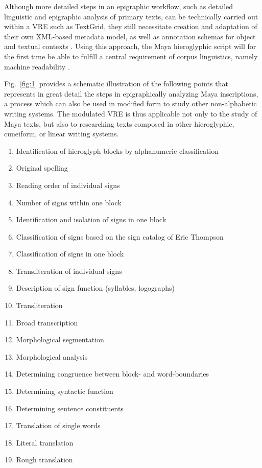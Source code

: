 \documentclass[amsthm,ebook]{saparticle}
\begin{document}
Although more detailed steps in an epigraphic workflow, such as detailed linguistic and epigraphic analysis of primary
texts, can be technically carried out within a VRE such as TextGrid, they still necessitate creation and adaptation of
their own XML-based metadata model, as well as annotation schemas for object and textual contexts \citep{Prager2015}. Using
this approach, the Maya hieroglyphic script will for the first time be able to fulfill a central requirement of corpus
linguistics, namely machine readability \citep{McEneryWilson2001}. 

Fig.~\ref{fig:1} provides a schematic illustration of the following points that represents in great detail the steps in
epigraphically analyzing Maya inscriptions, a process which can also be used in modified form to study other
non-alphabetic writing systems. The modulated VRE is thus applicable not only to the study of Maya texts, but also to
researching texts composed in other hieroglyphic, cuneiform, or linear writing systems. 




\begin{enumerate}
\item Identification of hieroglyph blocks by alphanumeric classification 
\item Original spelling
\item Reading order of individual signs 
\item Number of signs within one block 
\item Identification and isolation of signs in one block 
\item Classification of signs based on the sign catalog of Eric Thompson \citep{Thompson1962}
\item Classification of signs in one block \citep{Thompson1962} 
\item Transliteration of individual signs 
\item Description of sign function (syllables, logographs)
\item Transliteration 
\item Broad transcription
\item Morphological segmentation 
\item Morphological analysis 
\item Determining congruence between block- and word-boundaries 
\item Determining syntactic function 
\item Determining sentence constituents 
\item Translation of single words 
\item Literal translation 
\item Rough translation
\end{enumerate}
\end{document}
